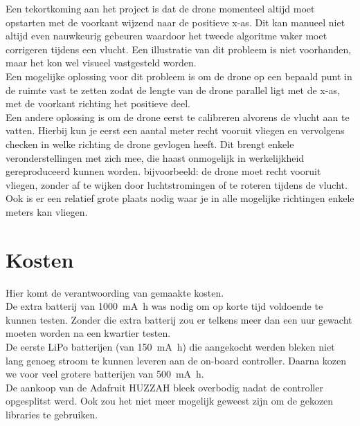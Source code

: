 Een tekortkoming aan het project is dat de drone momenteel altijd moet opstarten met de voorkant wijzend naar de positieve x-as.
Dit kan manueel niet altijd even nauwkeurig gebeuren waardoor het tweede algoritme vaker moet corrigeren tijdens een vlucht.
Een illustratie van dit probleem is niet voorhanden, maar het kon wel visueel vastgesteld worden.\\
Een mogelijke oplossing voor dit probleem is om de drone op een bepaald punt in de ruimte vast te zetten zodat de lengte van de drone parallel ligt met de x-as, met de voorkant richting het positieve deel.\\
Een andere oplossing is om de drone eerst te calibreren alvorens de vlucht aan te vatten.
Hierbij kun je eerst een aantal meter recht vooruit vliegen en vervolgens checken in welke richting de drone gevlogen heeft.
Dit brengt enkele veronderstellingen met zich mee, die haast onmogelijk in werkelijkheid gereproduceerd kunnen worden.
bijvoorbeeld: de drone moet recht vooruit vliegen, zonder af te wijken door luchtstromingen of te roteren tijdens de vlucht.
Ook is er een relatief grote plaats nodig waar je in alle mogelijke richtingen enkele meters kan vliegen.\\

\section{Kosten}
Hier komt de verantwoording van gemaakte kosten.\\
De extra batterij van \SI{1000}{\mA\hour} was nodig om op korte tijd voldoende te kunnen testen. Zonder die extra batterij zou er telkens meer dan een uur gewacht moeten worden na een kwartier testen.\\
De eerste LiPo batterijen (van \SI{150}{\mA\hour}) die aangekocht werden bleken niet lang genoeg stroom te kunnen leveren aan de on-board controller. Daarna kozen we voor veel grotere batterijen van \SI{500}{\mA\hour}.\\
De aankoop van de Adafruit HUZZAH bleek overbodig nadat de controller opgesplitst werd. Ook zou het niet meer mogelijk geweest zijn om de gekozen libraries te gebruiken.\\

